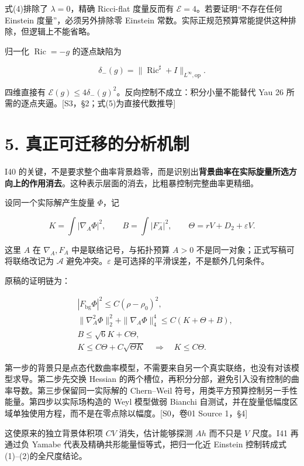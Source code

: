 \documentclass[UTF8,a4paper,11pt,fontset=fandol]{ctexart}
\begin{document}
式(4)排除了 \(\lambda=0\)，精确 Ricci-flat 度量反而有
\(\mathcal E=4\)。若要证明``不存在任何 Einstein 度量''，必须另外排除零
Einstein 常数。实际正规范预算常能提供这种排除，但逻辑上不能省略。

归一化 \(\operatorname{Ric}=-g\) 的逐点缺陷为

\[
\delta_-(g)=\|\operatorname{Ric}^{\sharp}+I\|_{L^\infty,\mathrm{op}}.
\]

四维直接有
\(\mathcal E(g)\le4\delta_-(g)^2\)。反向控制不成立：积分小量不能替代 Yau
26 所需的逐点夹逼。{[}S3，§2；式(5)为直接代数推导{]}

\section{5.
真正可迁移的分析机制}\label{ux771fux6b63ux53efux8fc1ux79fbux7684ux5206ux6790ux673aux5236}

I40
的关键，不是要求整个曲率背景趋零，而是识别出\textbf{背景曲率在实际旋量所选方向上的作用消去}。这种表示层面的消去，比粗暴控制完整曲率更精细。

设同一个实际解产生旋量 \(\Phi\)，记

\[
K=\int|\nabla_A\Phi|^2,\qquad
B=\int|F_A^-|^2,\qquad
\Theta=rV+D_2+\varepsilon V.
\]

这里 \(A\) 在 \(\nabla_A,F_A\) 中是联络记号，与拓扑预算 \(A>0\)
不是同一对象；正式写稿可将联络改记为 \(\mathcal A\)
避免冲突。\(\varepsilon\) 是可选择的平滑误差，不是额外几何条件。

原稿的证明链为：

\[
\begin{aligned}
&|F_{\mathrm{bg}}\Phi|^2
\le C(\rho-\rho_0)^2,\\
&\|\nabla_A^2\Phi\|_2^2+
\|\nabla_A\Phi\|_4^4\le C(K+\Theta+B),\\
&B\le\sqrt6K+C\Theta,\\
&K\le C\Theta+C\sqrt{\Theta K}
\quad\Longrightarrow\quad K\le C\Theta.
\end{aligned}
\tag{6}
\]

第一步的背景只是点态代数曲率模型，不需要来自另一个真实联络，也没有对该模型求导。第二步先交换
Hessian
的两个槽位，再积分分部，避免引入没有控制的曲率导数。第三步保留同一实际解的
Chern--Weil 符号，用类平方预算控制另一手性能量。第四步以实际场构造的
Weyl 模型做弱 Bianchi
自测试，并在旋量低幅度区域单独使用方程，而不是在零点除以幅度。{[}S0，卷01
Source 1，§4{]}

这使原来的独立背景体积项 \(CV\) 消失，估计能够探测 \(Ah\) 而不只是 \(V\)
尺度。I41 再通过负 Yamabe 代表及精确共形能量恒等式，把归一化近 Einstein
控制转成式(1)--(2)的全尺度结论。
\end{document}
